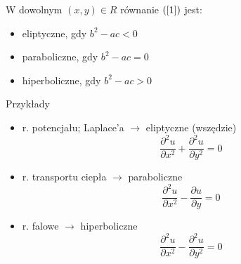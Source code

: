 \begin{frame}
  W dowolnym $(x,y) \in R$ równanie $(\ref{1})$ jest:
  \begin{itemize}
    \item eliptyczne, gdy $b^2 - ac < 0$
    \item paraboliczne, gdy $b^2 - ac = 0$
    \item hiperboliczne, gdy $b^2 - ac > 0$
  \end{itemize}
\end{frame}

\begin{frame}
  \begin{exampleblock}{Przykłady}
      \begin{itemize}
        \item r. potencjału; Laplace'a $\rightarrow$ eliptyczne (wszędzie)
        $$\frac{{\partial}^2u}{{\partial}x^2} + \frac{{\partial}^2u}{{\partial}y^2} = 0$$

        \item r. transportu ciepła $\rightarrow$ paraboliczne
        $$\frac{{\partial}^2u}{{\partial}x^2} - \frac{{\partial}u}{{\partial}y} = 0$$

        \item r. falowe $\rightarrow$ hiperboliczne
        $$\frac{{\partial}^2u}{{\partial}x^2} - \frac{{\partial}^2u}{{\partial}y^2} = 0$$
      \end{itemize}
  \end{exampleblock}
\end{frame}
